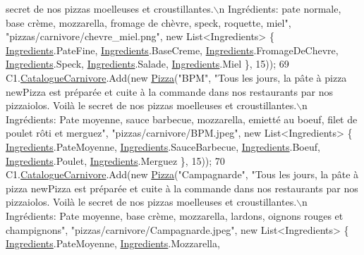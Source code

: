 \begin{DoxyCode}
{       secret de nos pizzas moelleuses et croustillantes.\(\backslash\)n Ingrédients: pate normale, base crème, mozzarella,
       fromage de chèvre, speck, roquette, miel"}, \textcolor{stringliteral}{"pizzas/carnivore/chevre\_miel.png"}, \textcolor{keyword}{new} List<Ingredients> \{ 
      \hyperlink{namespaceModele_a001a8e89e56a724f24a249ba98080d41}{Ingredients}.PateFine, \hyperlink{namespaceModele_a001a8e89e56a724f24a249ba98080d41}{Ingredients}.BaseCreme, \hyperlink{namespaceModele_a001a8e89e56a724f24a249ba98080d41}{Ingredients}.FromageDeChevre, 
      \hyperlink{namespaceModele_a001a8e89e56a724f24a249ba98080d41}{Ingredients}.Speck, \hyperlink{namespaceModele_a001a8e89e56a724f24a249ba98080d41}{Ingredients}.Salade, \hyperlink{namespaceModele_a001a8e89e56a724f24a249ba98080d41}{Ingredients}.Miel \}, 15));
69             C1.\hyperlink{classModele_1_1Catalogue_a4af9ef768f67cef6dfe545e22a6d63af}{CatalogueCarnivore}.Add(\textcolor{keyword}{new} \hyperlink{classModele_1_1Pizza}{Pizza}(\textcolor{stringliteral}{"BPM"}, \textcolor{stringliteral}{"Tous les jours, la pâte à
       pizza newPizza est préparée et cuite à la commande dans nos restaurants par nos pizzaiolos. Voilà le secret de
       nos pizzas moelleuses et croustillantes.\(\backslash\)n Ingrédients: Pate moyenne, sauce barbecue, mozzarella, emietté
       au boeuf, filet de poulet rôti et merguez"}, \textcolor{stringliteral}{"pizzas/carnivore/BPM.jpeg"}, \textcolor{keyword}{new} List<Ingredients> \{ 
      \hyperlink{namespaceModele_a001a8e89e56a724f24a249ba98080d41}{Ingredients}.PateMoyenne, \hyperlink{namespaceModele_a001a8e89e56a724f24a249ba98080d41}{Ingredients}.SauceBarbecue, 
      \hyperlink{namespaceModele_a001a8e89e56a724f24a249ba98080d41}{Ingredients}.Boeuf, \hyperlink{namespaceModele_a001a8e89e56a724f24a249ba98080d41}{Ingredients}.Poulet, \hyperlink{namespaceModele_a001a8e89e56a724f24a249ba98080d41}{Ingredients}.Merguez \}, 15));
70             C1.\hyperlink{classModele_1_1Catalogue_a4af9ef768f67cef6dfe545e22a6d63af}{CatalogueCarnivore}.Add(\textcolor{keyword}{new} \hyperlink{classModele_1_1Pizza}{Pizza}(\textcolor{stringliteral}{"Campagnarde"}, \textcolor{stringliteral}{"Tous les jours, la
       pâte à pizza newPizza est préparée et cuite à la commande dans nos restaurants par nos pizzaiolos. Voilà le
       secret de nos pizzas moelleuses et croustillantes.\(\backslash\)n Ingrédients: Pate moyenne, base crème, mozzarella,
       lardons, oignons rouges et champignons"}, \textcolor{stringliteral}{"pizzas/carnivore/Campagnarde.jpeg"}, \textcolor{keyword}{new} List<Ingredients> \{ 
      \hyperlink{namespaceModele_a001a8e89e56a724f24a249ba98080d41}{Ingredients}.PateMoyenne, \hyperlink{namespaceModele_a001a8e89e56a724f24a249ba98080d41}{Ingredients}.Mozzarella, 

\end{DoxyCode}
